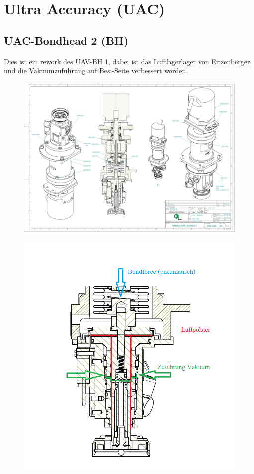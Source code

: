 \section{Ultra Accuracy (UAC)}

	\subsection{UAC-Bondhead 2 (BH)}
		Dies ist ein rework des UAV-BH 1, dabei ist das Luftlagerlager von Eitzenberger und die Vakuumzuführung auf Besi-Seite verbessert worden.
		\begin{figure}[h!]
			\centering
			\includegraphics[width=0.999\linewidth]{./pics/UAC/UAC_Bondhead2.pdf}
		\end{figure}
		\begin{figure}[h!]
			\centering
			\includegraphics[width=\linewidth]{./pics/UAC/pneu.png}
		\end{figure}
